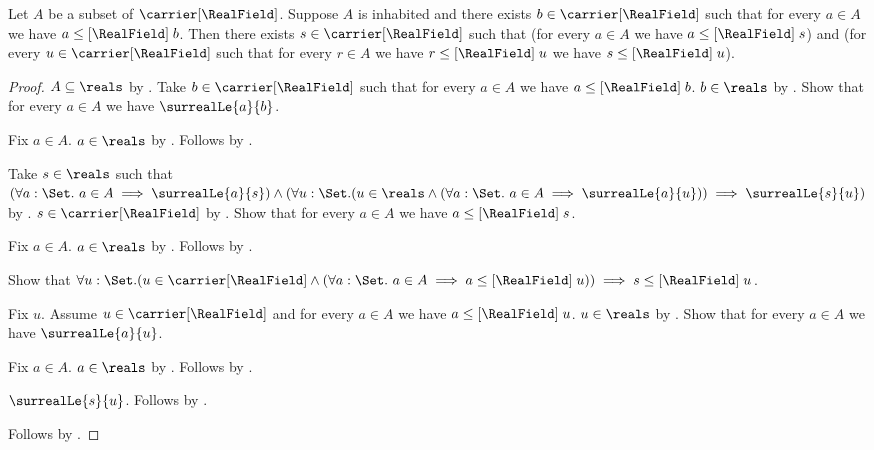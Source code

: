 \begin{proposition}\label{surreal_real_field_completeness_law}
    Let $A$ be a subset of $\carrier[\RealField]$.
    Suppose $A$ is inhabited and there exists
        $b\in\carrier[\RealField]$ such that for every $a\in A$
        we have $a\mathrel{\leq[\RealField]}b$.
    Then there exists $s\in\carrier[\RealField]$ such that
        (for every $a\in A$ we have
            $a\mathrel{\leq[\RealField]}s$) and
        (for every $u\in\carrier[\RealField]$ such that
            for every $r\in A$ we have
            $r\mathrel{\leq[\RealField]}u$ we have
            $s\mathrel{\leq[\RealField]}u$).
\end{proposition}
\begin{proof}
    $A\subseteq\reals$ by .
    Take $b\in\carrier[\RealField]$ such that for every $a\in A$
        we have $a\mathrel{\leq[\RealField]}b$.
    $b\in\reals$ by .
    Show that for every $a\in A$ we have $\surrealLe{a}{b}$.
    \begin{subproof}
        Fix $a\in A$.
        $a\in\reals$ by .
        Follows by .
    \end{subproof}
    Take $s\in\reals$ such that
        $(\forall a:\Set.\ a\in A\implies\surrealLe{a}{s})\land
        (\forall u:\Set.
            (u\in\reals\land
             (\forall a:\Set.\ a\in A\implies\surrealLe{a}{u}))
            \implies\surrealLe{s}{u})$
        by .
    $s\in\carrier[\RealField]$ by .
    Show that for every $a\in A$ we have
        $a\mathrel{\leq[\RealField]}s$.
    \begin{subproof}
        Fix $a\in A$.
        $a\in\reals$ by .
        Follows by .
    \end{subproof}
    Show that
        $\forall u:\Set.
            (u\in\carrier[\RealField]\land
             (\forall a:\Set.\ a\in A\implies
                a\mathrel{\leq[\RealField]}u))
            \implies s\mathrel{\leq[\RealField]}u$.
    \begin{subproof}
        Fix $u$.
        Assume $u\in\carrier[\RealField]$ and for every $a\in A$
            we have $a\mathrel{\leq[\RealField]}u$.
        $u\in\reals$ by .
        Show that for every $a\in A$ we have $\surrealLe{a}{u}$.
        \begin{subproof}
            Fix $a\in A$.
            $a\in\reals$ by .
            Follows by .
        \end{subproof}
        $\surrealLe{s}{u}$.
        Follows by .
    \end{subproof}
    Follows by \auto.
\end{proof}

